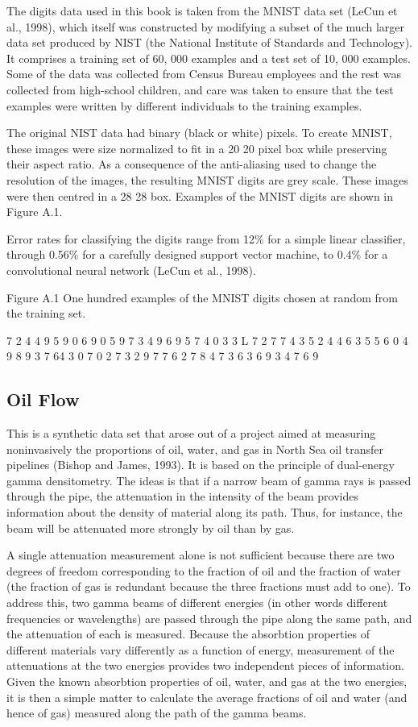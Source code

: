 \documentclass[
  10
]{article}
\begin{document}
The digits data used in this book is taken from the MNIST data set
(LeCun et al., 1998), which itself was constructed by modifying a subset
of the much larger data set produced by NIST (the National Institute of
Standards and Technology). It comprises a training set of 60, 000
examples and a test set of 10, 000 examples. Some of the data was
collected from Census Bureau employees and the rest was collected from
high-school children, and care was taken to ensure that the test
examples were written by different individuals to the training examples.

The original NIST data had binary (black or white) pixels. To create
MNIST, these images were size normalized to fit in a 20 20 pixel box
while preserving their aspect ratio. As a consequence of the
anti-aliasing used to change the resolution of the images, the resulting
MNIST digits are grey scale. These images were then centred in a 28 28
box. Examples of the MNIST digits are shown in Figure A.1.

Error rates for classifying the digits range from 12\% for a simple
linear classifier, through 0.56\% for a carefully designed support
vector machine, to 0.4\% for a convolutional neural network (LeCun et
al., 1998).

Figure A.1 One hundred examples of the MNIST digits chosen at random
from the training set.

7 2 4 4 9 5 9 0 6 9 0 5 9 7 3 4 9 6 9 5 7 4 0 3 3 L 7 2 7 7 4 3 5 2 4 4
6 3 5 5 6 0 4 9 8 9 3 7 64 3 0 7 0 2 7 3 2 9 7 7 6 2 7 8 4 7 3 6 3 6 9 3
4 7 6 9

\subsection{Oil Flow}\label{oil-flow}

This is a synthetic data set that arose out of a project aimed at
measuring noninvasively the proportions of oil, water, and gas in North
Sea oil transfer pipelines (Bishop and James, 1993). It is based on the
principle of dual-energy gamma densitometry. The ideas is that if a
narrow beam of gamma rays is passed through the pipe, the attenuation in
the intensity of the beam provides information about the density of
material along its path. Thus, for instance, the beam will be attenuated
more strongly by oil than by gas.

A single attenuation measurement alone is not sufficient because there
are two degrees of freedom corresponding to the fraction of oil and the
fraction of water (the fraction of gas is redundant because the three
fractions must add to one). To address this, two gamma beams of
different energies (in other words different frequencies or wavelengths)
are passed through the pipe along the same path, and the attenuation of
each is measured. Because the absorbtion properties of different
materials vary differently as a function of energy, measurement of the
attenuations at the two energies provides two independent pieces of
information. Given the known absorbtion properties of oil, water, and
gas at the two energies, it is then a simple matter to calculate the
average fractions of oil and water (and hence of gas) measured along the
path of the gamma beams.
\end{document}
